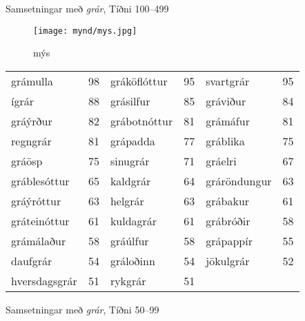\documentclass[../samsetningasafn.tex]{subfiles}
\begin{document}
\begin{wordlist}[H]
\begin{tcolorbox}
\end{tcolorbox}
	\caption{Samsetningar með \textit{grár}, Tíðni 100--499}
	\label{listi:gratt.100}
\end{wordlist}

\begin{figure}[H]
\begin{tcolorbox}
\centering
	\texttt{[image: mynd/mys.jpg]}
\end{tcolorbox}
	\caption{mýs}
	\label{mynd:mys}
\end{figure}

\begin{wordlist}[H]
\begin{tcolorbox}

	\setlength{\extrarowheight}{3pt}
	\begin{tabular}{BlBlBl}
		grámulla	& 98		&  
		gráköflóttur	& 95		& 	
		svartgrár	& 95		\\ 	
		ígrár		& 88		& 	
		grásilfur		& 85		& 	
		gráviður		& 84		\\ 
		gráýrður		& 82		& 	
		grábotnóttur & 81		& 	
		grámáfur	& 81		\\ 	
		regngrár		& 81		& 	
		grápadda	& 77		& 
		gráblika		& 75		\\ 		
		gráösp		& 75		& 	
		sinugrár		& 71		& 		
		gráelri		& 67		\\ 
		gráblesóttur	& 65		& 	
		kaldgrár		& 64		& 	
		gráröndungur & 63		\\ 	
		gráýróttur	& 63		& 	
		helgrár		& 63		& 		
		grábakur	& 61		\\ 	
		gráteinóttur	& 61		& 
		kuldagrár	& 61		& 	
		grábróðir	& 58		\\ 
		grámálaður	& 58		& 	
		gráúlfur		& 58		& 	
		grápappír	& 55		\\ 	
		daufgrár		& 54		& 	
		gráloðinn	& 54		& 	
		jökulgrár	& 52		\\ 	
		hversdagsgrár & 51		& 	
		rykgrár		& 51		& 	
					&
	\end{tabular}

\end{tcolorbox}
	\caption{Samsetningar með \textit{grár}, Tíðni 50--99}
	\label{listi:gratt.50}
\end{wordlist}
\end{document}

